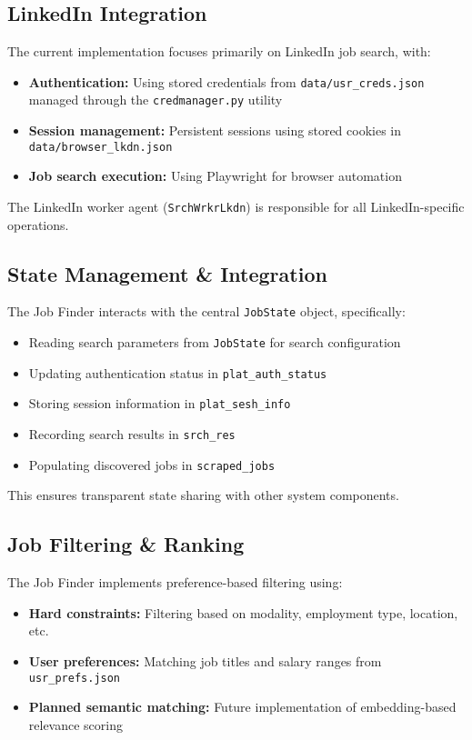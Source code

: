 \documentclass[a4paper,12pt]{article}
\begin{document}
\subsection{LinkedIn Integration}
The current implementation focuses primarily on LinkedIn job search, with:

\begin{itemize}
    \item \textbf{Authentication:} Using stored credentials from \texttt{data/usr\_creds.json} managed through the \texttt{credmanager.py} utility
    \item \textbf{Session management:} Persistent sessions using stored cookies in \texttt{data/browser\_lkdn.json}
    \item \textbf{Job search execution:} Using Playwright for browser automation
\end{itemize}

The LinkedIn worker agent (\texttt{SrchWrkrLkdn}) is responsible for all LinkedIn-specific operations.

\subsection{State Management \& Integration}
The Job Finder interacts with the central \texttt{JobState} object, specifically:

\begin{itemize}
    \item Reading search parameters from \texttt{JobState} for search configuration
    \item Updating authentication status in \texttt{plat\_auth\_status}
    \item Storing session information in \texttt{plat\_sesh\_info}
    \item Recording search results in \texttt{srch\_res}
    \item Populating discovered jobs in \texttt{scraped\_jobs}
\end{itemize}

This ensures transparent state sharing with other system components.

\subsection{Job Filtering \& Ranking}
The Job Finder implements preference-based filtering using:

\begin{itemize}
    \item \textbf{Hard constraints:} Filtering based on modality, employment type, location, etc.
    \item \textbf{User preferences:} Matching job titles and salary ranges from \texttt{usr\_prefs.json}
    \item \textbf{Planned semantic matching:} Future implementation of embedding-based relevance scoring
\end{itemize}
\end{document}
